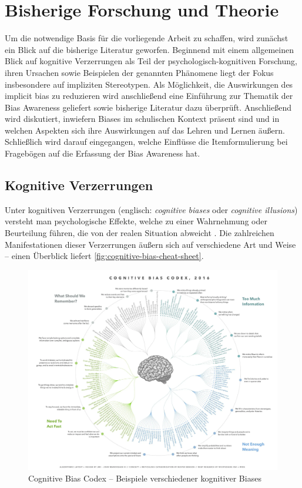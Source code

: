 \chapter{Bisherige Forschung und Theorie}
\label{ch:bisherige-forschung}

Um die notwendige Basis für die vorliegende Arbeit zu schaffen, wird zunächst ein Blick auf die bisherige Literatur geworfen.
Beginnend mit einem allgemeinen Blick auf kognitive Verzerrungen als Teil der psychologisch-kognitiven Forschung, ihren Ursachen sowie Beispielen der genannten Phänomene liegt der Fokus insbesondere auf impliziten Stereotypen.
Als Möglichkeit, die Auswirkungen des implicit bias zu reduzieren wird anschließend eine Einführung zur Thematik der Bias Awareness geliefert sowie bisherige Literatur dazu überprüft.
Anschließend wird diskutiert, inwiefern Biases im schulischen Kontext präsent sind und in welchen Aspekten sich ihre Auswirkungen auf das Lehren und Lernen äußern.
Schließlich wird darauf eingegangen, welche Einflüsse die Itemformulierung bei Fragebögen auf die Erfassung der Bias Awareness hat.


\section{Kognitive Verzerrungen}
\label{sec:kognitive-verzerrungen}

Unter kognitiven Verzerrungen (englisch: \emph{cognitive biases} oder \emph{cognitive illusions}) versteht man psychologische Effekte, welche zu einer Wahrnehmung oder Beurteilung führen, die von der realen Situation abweicht \citep{pohl2004cognitive}.
Die zahlreichen Manifestationen dieser Verzerrungen äußern sich auf verschiedene Art und Weise -- einen Überblick liefert \autoref{fig:cognitive-bias-cheat-sheet}.

\begin{figure}[h!]
	\centering
	\includegraphics[width=\textwidth]{resources/cognitive-bias-cheat-sheet.png}
	\caption[Cognitive Bias Codex]{Cognitive Bias Codex -- Beispiele verschiedener kognitiver Biases \citep{benson2016cognitive}}
	\label{fig:cognitive-bias-cheat-sheet}
\end{figure}

